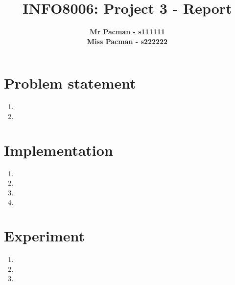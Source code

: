 \documentclass{article}
\begin{document}

\title{\Large{INFO8006: Project 3 - Report}}
\vspace{1cm}
\author{\small{\bf Mr Pacman - s111111} \\ \small{\bf Miss Pacman - s222222}}

\maketitle


\section{Problem statement}

\begin{enumerate}[label=\alph*.]
    \item
    \item
\end{enumerate}

\section{Implementation}

\begin{enumerate}[label=\alph*.]
    \item
    \item
    \item
    \item
\end{enumerate}

\section{Experiment}

\begin{enumerate}[label=\alph*.]
    \item
    \item
    \item
\end{enumerate}



\end{document}
